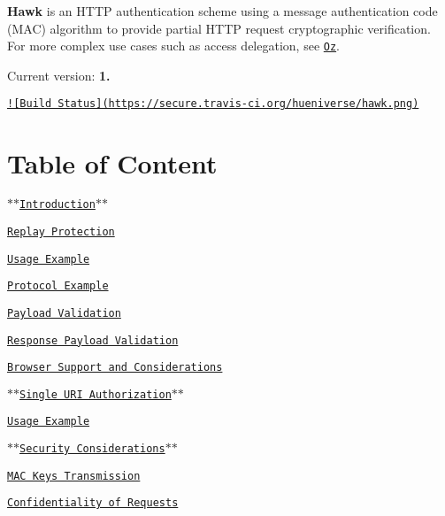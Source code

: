 

 {\bfseries Hawk} is an H\+T\+T\+P authentication scheme using a message authentication code (M\+A\+C) algorithm to provide partial H\+T\+T\+P request cryptographic verification. For more complex use cases such as access delegation, see \href{https://github.com/hueniverse/oz}{\tt Oz}.

Current version\+: {\bfseries 1.}

\href{http://travis-ci.org/hueniverse/hawk}{\tt !\mbox{[}Build Status\mbox{]}(https\+://secure.\+travis-\/ci.\+org/hueniverse/hawk.\+png)}

\section*{Table of Content}


\begin{DoxyItemize}
\item \href{#introduction}{\tt $\ast$$\ast$\+Introduction$\ast$$\ast$}
\begin{DoxyItemize}
\item \href{#replay-protection}{\tt Replay Protection}
\item \href{#usage-example}{\tt Usage Example}
\item \href{#protocol-example}{\tt Protocol Example}
\begin{DoxyItemize}
\item \href{#payload-validation}{\tt Payload Validation}
\item \href{#response-payload-validation}{\tt Response Payload Validation}
\end{DoxyItemize}
\item \href{#browser-support-and-considerations}{\tt Browser Support and Considerations} 
\end{DoxyItemize}
\item \href{#single-uri-authorization}{\tt $\ast$$\ast$\+Single U\+R\+I Authorization$\ast$$\ast$}
\begin{DoxyItemize}
\item \href{#bewit-usage-example}{\tt Usage Example} 
\end{DoxyItemize}
\item \href{#security-considerations}{\tt $\ast$$\ast$\+Security Considerations$\ast$$\ast$}
\begin{DoxyItemize}
\item \href{#mac-keys-transmission}{\tt M\+A\+C Keys Transmission}
\item \href{#confidentiality-of-requests}{\tt Confidentiality of Requests}

\end{DoxyItemize}
\end{DoxyItemize}
